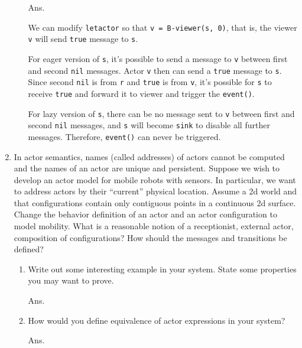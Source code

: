 \documentclass{article}
\begin{document}
\begin{enumerate}
\begin{enumerate}
Ans.

We can modify \texttt{letactor} so that \texttt{v = B-viewer(s, 0)}, that is, 
the viewer \texttt{v} will send \texttt{true} message to \texttt{s}.

For eager version of \texttt{s}, it's possible to send a message to \texttt{v} 
between first and second \texttt{nil} messages. Actor \texttt{v} then can send 
a \texttt{true} message to \texttt{s}. Since second \texttt{nil} is from 
\texttt{r} and \texttt{true} is from \texttt{v}, it's possible for \texttt{s} 
to receive \texttt{true} and forward it to viewer and trigger the 
\texttt{event()}.

For lazy version of \texttt{s}, there can be no message sent to \texttt{v}
between first and second \texttt{nil} messages, and \texttt{s} will become 
\texttt{sink} to disable all further messages. Therefore, \texttt{event()} can 
never be triggered.

\end{enumerate}

\item In actor semantics, names (called addresses) of actors cannot be computed
and the names of an actor are unique and persistent. Suppose we wish to develop
an actor model for mobile robots with sensors. In particular, we want to address
actors by their ``current'' physical location. Assume a 2d world and that
configurations contain only contiguous points in a continuous 2d surface. Change
the behavior definition of an actor and an actor configuration to model
mobility. What is a reasonable notion of a receptionist, external actor,
composition of configurations? How should the messages and transitions be
defined?
\begin{enumerate}
\item Write out some interesting example in your system. State some properties
you may want to prove.

Ans.



\item How would you define equivalence of actor expressions in your system?

Ans.


\end{enumerate}

\end{enumerate}
\end{document}
